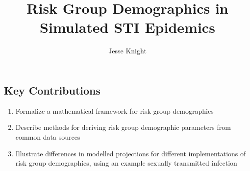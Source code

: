 \documentclass[10pt]{article}
\title{Risk Group Demographics in Simulated STI Epidemics}
\author{Jesse Knight}
\numberwithin{equation}{section}
\begin{document}
\maketitle
\tableofcontents
\subsection*{Key Contributions}
\begin{enumerate}
  \item Formalize a mathematical framework for risk group demographics
  \item Describe methods for deriving risk group demographic parameters from common data sources
  \item Illustrate differences in modelled projections
  for different implementations of risk group demographics,
  using an example sexually transmitted infection
\end{enumerate}
\clearpage
\end{document}
